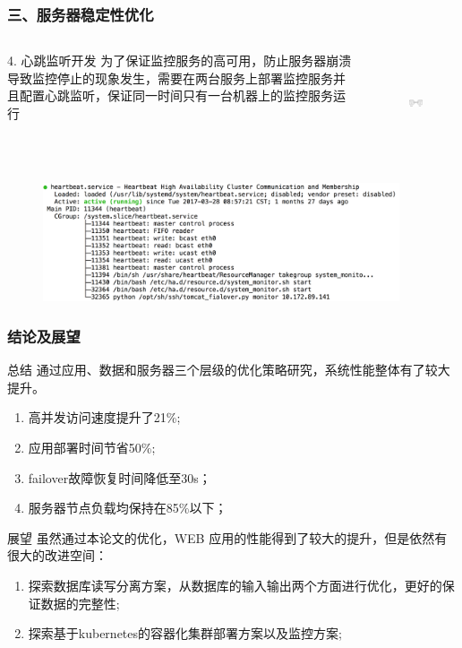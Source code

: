 \documentclass{beamer}
\begin{document}
\begin{frame}
\frametitle{三、服务器稳定性优化}
   \begin{columns}
      \begin{column}{0.50\textwidth}
      	\begin{block}{4. 心跳监听开发}
	 \footnotesize{为了保证监控服务的高可用，防止服务器崩溃导致监控停止的现象发生，需要在两台服务上部署监控服务并且配置心跳监听，保证同一时间只有一台机器上的监控服务运行}
  	\end{block}
     \end{column}
     \begin{column}{0.50\textwidth}
    	 \begin{figure}
 	 \centering
   	 \includegraphics[height=3cm]{./img/03/ha.png}
  	\end{figure}
     \end{column}
   \end{columns}
  \begin{figure}
  \centering
    \includegraphics[height=3.5cm]{./img/ha.png}
  \end{figure}
\end{frame}
\begin{frame}
  \frametitle{结论及展望}
  \begin{block}{总结}
    通过应用、数据和服务器三个层级的优化策略研究，系统性能整体有了较大提升。
    \begin{enumerate}
      \item 高并发访问速度提升了21\%;
      \item 应用部署时间节省50\%;
      \item failover故障恢复时间降低至30s；
      \item 服务器节点负载均保持在85\%以下；
    \end{enumerate}
  \end{block}
  \begin{block}{展望}
  虽然通过本论文的优化，WEB 应用的性能得到了较大的提升，但是依然有很大的改进空间：
    \begin{enumerate}
      \item 探索数据库读写分离方案，从数据库的输入输出两个方面进行优化，更好的保证数据的完整性;
      \item 探索基于kubernetes的容器化集群部署方案以及监控方案;
    \end{enumerate}
  \end{block}
\end{frame}
\begin{frame}
\end{frame}
\end{document}
